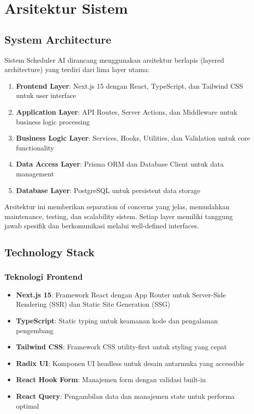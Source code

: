 \section{Arsitektur Sistem}

\subsection{System Architecture}

Sistem Scheduler AI dirancang menggunakan arsitektur berlapis (layered architecture) yang terdiri dari lima layer utama:

\begin{enumerate}
\item \textbf{Frontend Layer}: Next.js 15 dengan React, TypeScript, dan Tailwind CSS untuk user interface
\item \textbf{Application Layer}: API Routes, Server Actions, dan Middleware untuk business logic processing
\item \textbf{Business Logic Layer}: Services, Hooks, Utilities, dan Validation untuk core functionality
\item \textbf{Data Access Layer}: Prisma ORM dan Database Client untuk data management
\item \textbf{Database Layer}: PostgreSQL untuk persistent data storage
\end{enumerate}

Arsitektur ini memberikan separation of concerns yang jelas, memudahkan maintenance, testing, dan scalability sistem. Setiap layer memiliki tanggung jawab spesifik dan berkomunikasi melalui well-defined interfaces.

\subsection{Technology Stack}

\subsubsection{Teknologi Frontend}

\begin{itemize}
\item \textbf{Next.js 15}: Framework React dengan App Router untuk Server-Side Rendering (SSR) dan Static Site Generation (SSG)
\item \textbf{TypeScript}: Static typing untuk keamanan kode dan pengalaman pengembang
\item \textbf{Tailwind CSS}: Framework CSS utility-first untuk styling yang cepat
\item \textbf{Radix UI}: Komponen UI headless untuk desain antarmuka yang accessible
\item \textbf{React Hook Form}: Manajemen form dengan validasi built-in
\item \textbf{React Query}: Pengambilan data dan manajemen state untuk performa optimal
\end{itemize}


